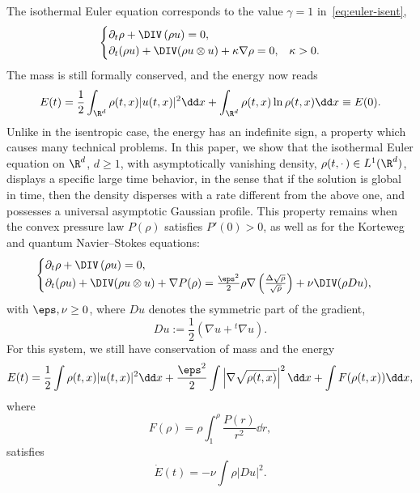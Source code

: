 The isothermal Euler equation corresponds to the value $\gamma=1$ in~\eqref{eq:euler-isent},
\begin{equation}\label{eq:euler-isotherme}
\begin{cases}
\partial_t \rho+\DIV\left(\rho u\right)=0,\\
\partial_t (\rho u) +\DIV(\rho u \otimes u)+\kappa\nabla
\rho= 0,& \kappa>0.
\end{cases}
\end{equation}
The mass is still formally conserved, and the energy now reads
\begin{equation*}
E(t) = \frac{1}{2}\int_{\R^d} \rho (t,x) |u(t,x)|^2 \dd x+\int_{\R^d}\rho(t,x)\ln \rho(t,x)
\dd x\equiv E(0).
\end{equation*}
Unlike in the isentropic case, the energy has an indefinite sign, a property which causes many technical problems. In this paper, we show that the isothermal Euler equation on $\R^d$, $d\ge 1$, with asymptotically vanishing density, $\rho(t,\cdot\,)\in L^1(\R^d)$, displays a specific large time behavior, in the sense that if the solution is global in time, then the density disperses with a rate different from the above one, and possesses a universal asymptotic Gaussian profile. This property remains when the convex pressure law $P(\rho)$ satisfies $P'(0)>0$, as well as for the Korteweg and quantum Navier--Stokes equations:
\begin{equation}\label{eq:NSK}
\begin{cases}
\partial_t \rho+\DIV\left(\rho u\right)=0,\\
\partial_t (\rho u) +\DIV (\rho u \otimes u) +
\nabla P(\rho)= \frac{\eps^2}{2}\rho\nabla\left(\frac{\Delta
\sqrt{\rho}}{\sqrt{\rho}}\right) + \nu \DIV (\rho D u),
\end{cases}
\end{equation}
with $\eps,\nu\ge 0$, where $Du$ denotes the symmetric part of the gradient,
\begin{equation*}
Du := \frac{1}{2}(\nabla u +{}^t\nabla u).
\end{equation*}
For this system, we still have conservation of mass and the energy
\begin{equation}\label{eq:energy-init}
E(t) = \frac{1}{2}\int \rho(t,x)|u(t,x)|^2 \dd x+\frac{\eps^2}{2} \int \left|\nabla
\sqrt{\rho(t,x)}\right|^2 \dd x+\int F(\rho(t,x)) \dd x,
\end{equation}
where
\begin{equation*}
F(\rho) = \rho\int_1^\rho \frac{P(r)}{r^2} \dd r,
\end{equation*}
satisfies
\begin{equation*}
\dot E(t) =- \nu \int \rho |Du|^2.
\end{equation*}

